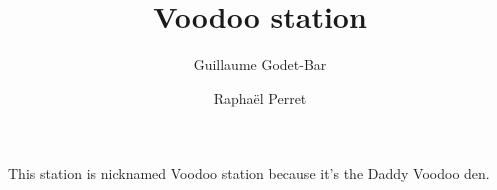 \documentclass{rpg_location}
\title{Voodoo station}
\begin{document}
\author{Guillaume Godet-Bar \and Rapha\"el Perret}
\maketitle


This station is nicknamed Voodoo station because it's the Daddy Voodoo den.
\end{document}
